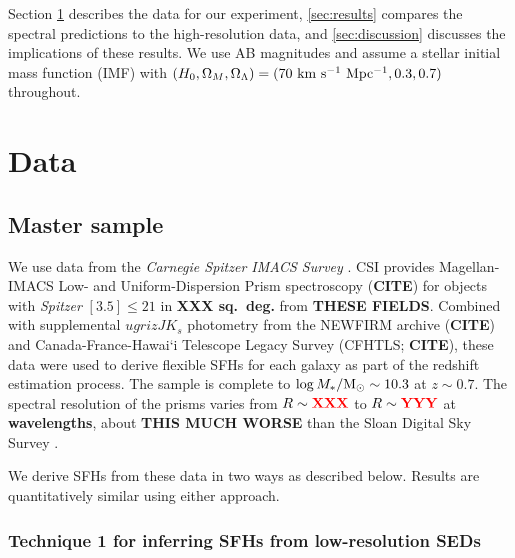 \documentclass[a4paper,fleqn,usenatbib]{mnras}
\newcommand{\Msun}{{\rm M}_\odot}
\newcommand{\Mstel}{M_\ast}
\newcommand{\logM}{\log\Mstel/\Msun}
\newcommand{\bfr}{\bf\color{red}}
\newcommand{\CITE}{{\bfr CITE}}
\begin{document}
Section \ref{sec:data} describes the data for our experiment, \ref{sec:results} compares 
the spectral predictions to the high-resolution data, and \ref{sec:discussion} discusses 
the implications of these results. We use AB magnitudes and assume 
a \citet{Chabrier03} stellar initial mass function (IMF) with $(H_{0}, \Omega_{M}, \Omega_{\Lambda}) =
(70~{\rm km~s^{-1}~Mpc^{-1}}, 0.3, 0.7)$ throughout.



\section{Data}
\label{sec:data}

\subsection{Master sample}
\label{sec:master}

We use data from the {\it Carnegie Spitzer IMACS Survey} \citep[CSI;][]{Kelson14a}. CSI provides
Magellan-IMACS Low- and Uniform-Dispersion Prism spectroscopy (\CITE) for objects with {\it Spitzer} 
$[3.5]\leq21$ in {\bfr XXX sq.~deg.} from {\bfr THESE FIELDS}. Combined with supplemental 
$ugrizJK_{s}$ photometry from the NEWFIRM archive (\CITE) and Canada-France-Hawai`i Telescope 
Legacy Survey (CFHTLS; \CITE), these data were used to derive flexible SFHs for each galaxy as part of 
the redshift estimation process. The sample is complete to $\logM\sim10.3$ at $z\sim0.7$.
The spectral resolution of the prisms varies from $R\sim{\bfr XXX}$ to $R\sim{\bfr YYY}$ at
{\bfr wavelengths}, about {\bfr THIS MUCH WORSE} than the Sloan Digital Sky Survey \citep{York00}.

We derive SFHs from these data in two ways as described below. Results are quantitatively similar
using either approach.


\subsubsection{Technique 1 for inferring SFHs from low-resolution SEDs}
\label{sec:blocks}
\end{document}
